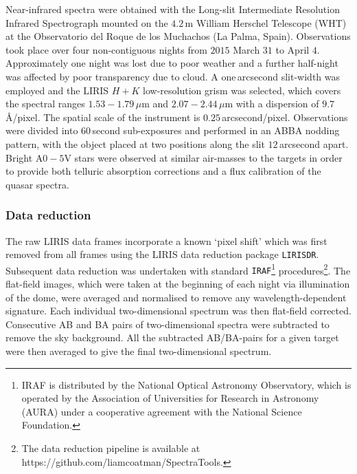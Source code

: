 Near-infrared spectra were obtained with the Long-slit Intermediate Resolution Infrared Spectrograph \citep[LIRIS;][]{manchado98} mounted on the $4.2$\,m William Herschel Telescope (WHT) at the Observatorio del Roque de los Muchachos (La Palma, Spain). 
Observations took place over four non-contiguous nights from $2015$ March $31$ to April $4$. 
Approximately one night was lost due to poor weather and a further half-night was affected by poor transparency due to cloud. 
A one\,arcsecond slit-width was employed and the LIRIS $H+K$ low-resolution grism was selected, which covers the spectral ranges $1.53-1.79$\,$\mu$m and $2.07-2.44$\,$\mu$m with a dispersion of $9.7$\,\AA/pixel. 
The spatial scale of the instrument is $0.25$\,arcsecond/pixel. 
Observations were divided into $60$\,second sub-exposures and performed in an ABBA nodding pattern, with the object placed at two positions along the slit $12$\,arcsecond apart. 
Bright A$0-5$V stars were observed at similar air-masses to the targets in order to provide both telluric absorption corrections and a flux calibration of the quasar spectra.

\subsubsection{Data reduction}

The raw LIRIS data frames incorporate a known `pixel shift' which was first removed from all frames using the LIRIS data reduction package {\tt LIRISDR}. 
Subsequent data reduction was undertaken with standard {\tt IRAF}\footnote{IRAF is distributed by the National Optical Astronomy Observatory, which is operated by the Association of Universities for Research in Astronomy (AURA) under a cooperative agreement with the National Science Foundation.} procedures\footnote{The data reduction pipeline is available at https://github.com/liamcoatman/SpectraTools.}.  
The flat-field images, which were taken at the beginning of each night via illumination of the dome, were averaged and normalised to remove any wavelength-dependent signature. 
Each individual two-dimensional spectrum was then flat-field corrected. 
Consecutive AB and BA pairs of two-dimensional spectra were subtracted to remove the sky background. 
All the subtracted AB/BA-pairs for a given target were then averaged to give the final two-dimensional spectrum.

